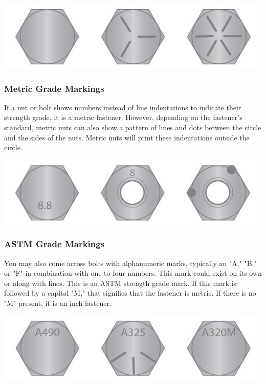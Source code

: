 \documentclass[english,]{article}
\begin{document}
\hypertarget{ivmctl}{}
\includegraphics{Introduction to Nut and Bolt Sizes_files/6307b8fa19b82843920771.jpg}

\hypertarget{i7ab7i}{%
\subsubsection{Metric Grade Markings}\label{i7ab7i}}

\hypertarget{i3f3hj}{}
If a nut or bolt shows numbers instead of line indentations to indicate
their strength grade, it is a metric fastener. However, depending on the
fastener's standard, metric nuts can also show a pattern of lines and
dots between the circle and the sides of the nuts. Metric nuts will
print these indentations outside the circle.

\hypertarget{i6g3ac}{}
\includegraphics{Introduction to Nut and Bolt Sizes_files/6307b947273e3119595489.jpg}

\hypertarget{iawz2f}{}

\hypertarget{in2ujb}{%
\subsubsection{ASTM Grade Markings}\label{in2ujb}}

\hypertarget{ibwq7f}{}
You may also come across bolts with alphanumeric marks, typically an
"A," "B," or "F" in combination with one to four numbers. This mark
could exist on its own or along with lines. This is an ASTM strength
grade mark. If this mark is followed by a capital "M," that signifies
that the fastener is metric. If there is no "M" present, it is an inch
fastener.

\hypertarget{ioka1w}{}
\includegraphics{Introduction to Nut and Bolt Sizes_files/6307b985e0134715291439.jpg}
\end{document}

